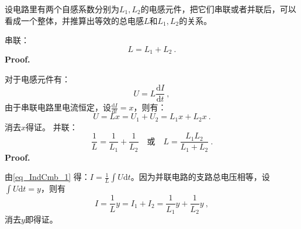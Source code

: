 
\begin{issues}
\issueDraft
\end{issues}

设电路里有两个自感系数分别为$L_1,L_2$的电感元件，把它们串联或者并联后，可以看成一个整体，并推算出等效的总电感$L$和$L_1,L_2$的关系。


串联：
\begin{equation}
L = L_1 + L_2~.
\end{equation}
\textbf{Proof.}

对于电感元件有：
\begin{equation}\label{eq_IndCmb_1}
U=L\frac{\mathrm d I}{\mathrm d t}~,
\end{equation}
由于串联电路里电流恒定，设$\frac{\mathrm d I}{\mathrm d t}=x$，则有：
\begin{equation}
U=Lx=U_1+U_2=L_1x+L_2x~.
\end{equation}
消去$x$得证。
并联：
\begin{equation}
\frac{1}{L} = \frac{1}{L_1} + \frac{1}{L_2}
\quad \text{或} \quad
L = \frac{L_1L_2}{L_1 + L_2}~.
\end{equation}
\textbf{Proof.}

由\autoref{eq_IndCmb_1} 得：$I=\frac{1}{L}\int U\mathrm dt$。因为并联电路的支路总电压相等，设$\int U\mathrm dt=y$，则有
\begin{equation}
I=\frac{1}{L}y=I_1+I_2=\frac{1}{L_1}y+\frac{1}{L_2}y~,
\end{equation}
消去$y$即得证。


